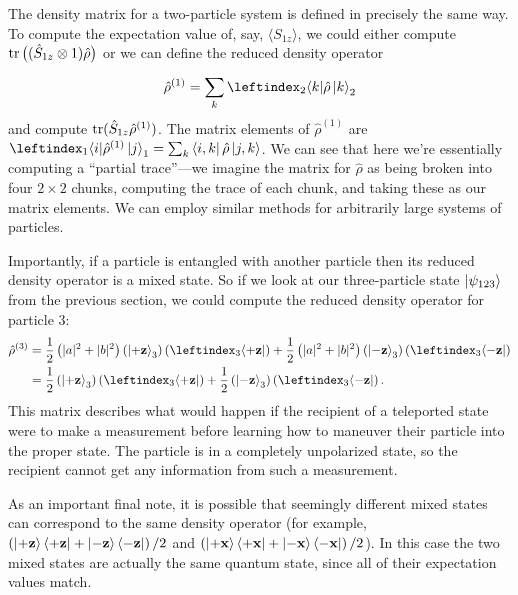 \documentclass[../p116main.tex]{subfiles}
\begin{document}
The density matrix for a two-particle system is defined in precisely the same way.
To compute the expectation value of, say, $\langle S_{1z} \rangle$, we could either compute $\operatorname{tr} \big( (\hat S_{1z} \otimes 1) \hat \rho \big)$ or we can define the reduced density operator
\[ \hat \rho^{(1)} = \sum_{k}^{} \leftindex_2{\bra{k}} \hat \rho \ket{k}_2 \]
and compute $\operatorname{tr} (\hat S_{1z} \hat \rho^{(1)})$.
The matrix elements of $\hat \rho^{(1)}$ are $\leftindex_1{\bra{i}} \hat \rho^{(1)} \ket{j}_1 = \sum_{k}^{} \bra{i,k} \hat \rho \ket{j,k}$.
We can see that here we're essentially computing a ``partial trace''---we imagine the matrix for $\hat \rho$ as being broken into four $2 \times 2$ chunks, computing the trace of each chunk, and taking these as our matrix elements.
We can employ similar methods for arbitrarily large systems of particles.

Importantly, if a particle is entangled with another particle then its reduced density operator is a mixed state.
So if we look at our three-particle state $\left| \psi_{123} \right>$ from the previous section, we could compute the reduced density operator for particle 3:
\begin{align*}
    \hat \rho^{(3)} &= \frac{1}{2} \left( |a|^2 + |b|^2 \right) \left( \ket{+\mbf{z}}_3 \right) \left( \leftindex_3{\bra{+\mbf{z}}} \right) + \frac{1}{2} \left( |a|^2 + |b|^2 \right) \left( \ket{-\mbf{z}}_3 \right) \left( \leftindex_3{\bra{-\mbf{z}}} \right) \\
    &= \frac{1}{2} \left( \ket{+\mbf{z}}_3 \right) \left( \leftindex_3{\bra{+\mbf{z}}} \right) + \frac{1}{2} \left( \ket{-\mbf{z}}_3 \right) \left( \leftindex_3{\bra{-\mbf{z}}} \right).
\end{align*}
This matrix describes what would happen if the recipient of a teleported state were to make a measurement before learning how to maneuver their particle into the proper state.
The particle is in a completely unpolarized state, so the recipient cannot get any information from such a measurement.

As an important final note, it is possible that seemingly different mixed states can correspond to the same density operator (for example, $\left( \left| +\mathbf{z} \right> \left< +\mathbf{z} \right| + \left| -\mathbf{z} \right> \left< -\mathbf{z} \right| \right) / 2$ and $\left( \left| +\mathbf{x} \right> \left< +\mathbf{x} \right| + \left| -\mathbf{x} \right> \left< -\mathbf{x} \right| \right) / 2$).
In this case the two mixed states are actually the same quantum state, since all of their expectation values match.
\end{document}
